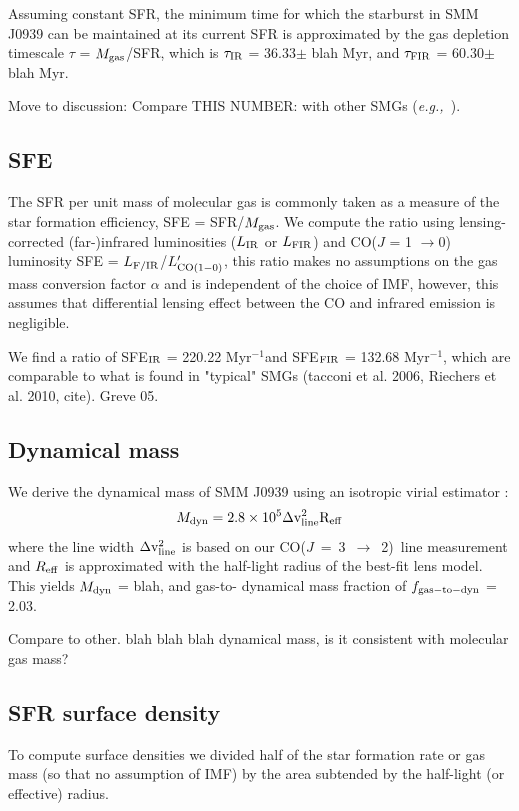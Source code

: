 \documentclass[twocolumn,apj,numberedappendix]{emulateapj}
\newcommand{\rarr}{$\rightarrow$}
\newcommand{\CO}{\mbox{CO($J$ = 3 $\rightarrow$ 2) }}
\newcommand{\Lp}{\mbox{$L^{\prime}_{\rm CO(1-0)}$}}
\newcommand{\eg}{{\sl e.g.,~}}
\newcommand{\pmOne}{$^{-1}$}
\begin{document}
Assuming constant SFR, the minimum time for which the starburst in SMM J0939 can be maintained at its
current SFR is approximated by the gas depletion timescale $\tau$ = $M_{\rm gas}$/SFR, which is $\tau_{\rm IR}$ = 36.33$\pm$ blah 
Myr, and $\tau_{\rm FIR}$ = 60.30$\pm$blah Myr.

Move to discussion: Compare THIS NUMBER: with other SMGs (\eg \citep{Greve05a}). 

\subsection{SFE}
The SFR per unit mass of molecular gas is commonly taken as a
measure of the star formation efficiency, SFE = SFR/$M_{\rm gas}$. We compute the ratio using lensing-corrected (far-)infrared 
luminosities ($L_{\rm IR}$ or $L_{\rm FIR}$) and CO($J$ = 1 \rarr 0) luminosity SFE = $L_{\rm F/IR}$/\Lp, this ratio makes no assumptions on the gas mass conversion factor $\alpha$ and is independent of the 
choice of IMF, however, this assumes that differential lensing effect between the CO and infrared emission is negligible.

We find a ratio of SFE$_{\rm IR}$ = 220.22 Myr\pmOne and SFE$_{\rm FIR}$ = 132.68 Myr\pmOne, which are comparable
to what is found in "typical" SMGs (tacconi et al. 2006, Riechers et al. 2010, cite).
Greve 05.

\subsection{Dynamical mass} %
We derive the dynamical mass of SMM J0939 using an isotropic virial estimator \citep[\eg][]{Engel10a}:
\begin{equation}
M_{\rm dyn} = 2.8\times 10^5\Delta \rm v_{\rm line}^ 2 R_{\rm eff}
\end{equation}
where the line width $\Delta \rm v_{\rm line}^ 2$ is based on our \CO line
measurement and $R_{\rm eff}$ is approximated with the half-light radius of the best-fit lens model. This yields $M_{\rm dyn}$ = blah, and gas-to-
dynamical mass fraction of $f_{\rm gas-to-dyn}$ = 2.03.

Compare to other. blah blah blah dynamical mass, is it consistent with molecular gas mass?

\subsection{SFR surface density}
To compute surface densities we divided half of the star formation rate or gas mass (so that no assumption of IMF) by the area subtended by the half-light (or effective) radius.
\end{document}
